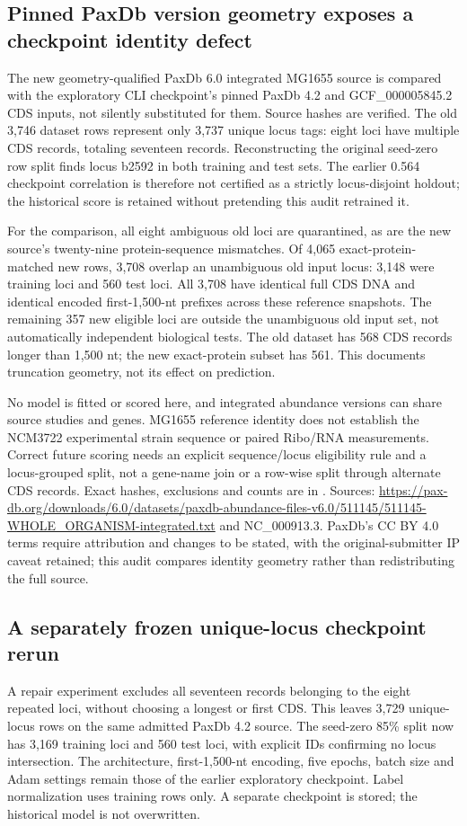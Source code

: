 \subsection{Pinned PaxDb version geometry exposes a checkpoint identity defect}
The new geometry-qualified PaxDb 6.0 integrated MG1655 source is compared with the exploratory CLI checkpoint's pinned PaxDb 4.2 and GCF\_000005845.2 CDS inputs, not silently substituted for them. Source hashes are verified. The old 3,746 dataset rows represent only 3,737 unique locus tags: eight loci have multiple CDS records, totaling seventeen records. Reconstructing the original seed-zero row split finds locus b2592 in both training and test sets. The earlier 0.564 checkpoint correlation is therefore not certified as a strictly locus-disjoint holdout; the historical score is retained without pretending this audit retrained it.

For the comparison, all eight ambiguous old loci are quarantined, as are the new source's twenty-nine protein-sequence mismatches. Of 4,065 exact-protein-matched new rows, 3,708 overlap an unambiguous old input locus: 3,148 were training loci and 560 test loci. All 3,708 have identical full CDS DNA and identical encoded first-1,500-nt prefixes across these reference snapshots. The remaining 357 new eligible loci are outside the unambiguous old input set, not automatically independent biological tests. The old dataset has 568 CDS records longer than 1,500 nt; the new exact-protein subset has 561. This documents truncation geometry, not its effect on prediction.

No model is fitted or scored here, and integrated abundance versions can share source studies and genes. MG1655 reference identity does not establish the NCM3722 experimental strain sequence or paired Ribo/RNA measurements. Correct future scoring needs an explicit sequence/locus eligibility rule and a locus-grouped split, not a gene-name join or a row-wise split through alternate CDS records. Exact hashes, exclusions and counts are in . Sources: \url{https://pax-db.org/downloads/6.0/datasets/paxdb-abundance-files-v6.0/511145/511145-WHOLE_ORGANISM-integrated.txt} and NC\_000913.3. PaxDb's CC BY 4.0 terms require attribution and changes to be stated, with the original-submitter IP caveat retained; this audit compares identity geometry rather than redistributing the full source.

\subsection{A separately frozen unique-locus checkpoint rerun}
A repair experiment excludes all seventeen records belonging to the eight repeated loci, without choosing a longest or first CDS. This leaves 3,729 unique-locus rows on the same admitted PaxDb 4.2 source. The seed-zero 85\% split now has 3,169 training loci and 560 test loci, with explicit IDs confirming no locus intersection. The architecture, first-1,500-nt encoding, five epochs, batch size and Adam settings remain those of the earlier exploratory checkpoint. Label normalization uses training rows only. A separate checkpoint is stored; the historical model is not overwritten.

